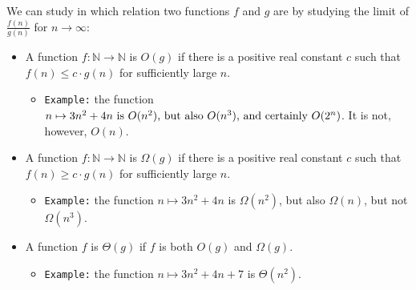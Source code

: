 \documentclass{article}
\begin{document}
			We can study in which relation two functions
			$f$ and $g$ are by studying the limit of $\frac{f(n)}{g(n)}$ for $n\to\infty$:
			\begin{itemize}
    			\item A function $f: \mathbb{N} \rightarrow \mathbb{N}$ is $O(g)$ if there is a positive real constant \(c\) such that \(f(n) \leq c \cdot g(n)\) for sufficiently large $n$.
        			\begin{itemize}
            			\item \texttt{Example:} the function $n \mapsto 3n^2 + 4n\) is \(O(n^2)\), but also \(O(n^3)\), and certainly \(O(2^n)$. It is not, however, $O(n)$.
        			\end{itemize}
    			\item A function $f: \mathbb{N} \rightarrow \mathbb{N}$ is $\Omega(g)$ if there is a positive real constant $c$ such that $f(n) \geq c \cdot g(n)$ for sufficiently large $n$.
        			\begin{itemize}
            			\item \texttt{Example:} the function $n \mapsto 3n^2 + 4n$ is $\Omega(n^2)$, but also \(\Omega(n)\), but not $\Omega(n^3)$.
        			\end{itemize}
    			\item A function $f$ is $\Theta(g)$ if $f$ is both $O(g)$ and $\Omega(g)$.
        			\begin{itemize}
            			\item \texttt{Example:} the function $n \mapsto 3n^2 + 4n + 7$ is $\Theta(n^2)$.
        			\end{itemize}
			\end{itemize}
\end{document}
